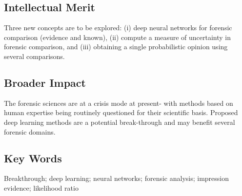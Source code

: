 \documentclass[11pt, singlespacing]{article}  %
\begin{document}
\subsection*{Intellectual Merit}
Three new concepts are to be explored: (i) deep neural networks for forensic comparison (evidence and known), (ii)  compute a measure of uncertainty in forensic comparison,  and (iii) obtaining a single probabilistic opinion using several comparisons. 
\subsection*{Broader Impact}
The forensic sciences are at a crisis mode at present- with methods based on human expertise being routinely questioned for their scientific basis.  Proposed deep learning methods are a  potential break-through and may benefit several  forensic domains.
\subsection*{Key Words}
Breakthrough; deep learning; neural networks; forensic analysis; impression evidence; likelihood ratio
 
 
\end{document}

